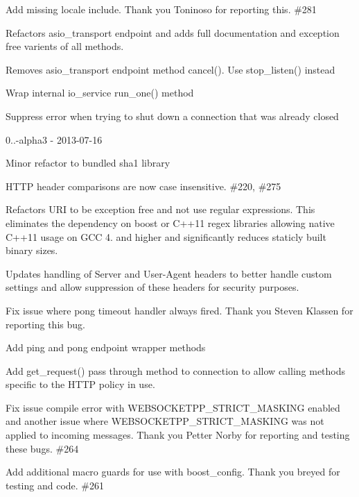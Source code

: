 \begin{DoxyItemize}
\item Add missing locale include. Thank you Toninoso for reporting this. \#281
\item Refactors {\ttfamily asio\+\_\+transport} endpoint and adds full documentation and exception free varients of all methods.
\item Removes {\ttfamily asio\+\_\+transport} endpoint method cancel(). Use {\ttfamily stop\+\_\+listen()} instead
\item Wrap internal {\ttfamily io\+\_\+service} {\ttfamily run\+\_\+one()} method
\item Suppress error when trying to shut down a connection that was already closed
\end{DoxyItemize}

0..-\/alpha3 -\/ 2013-\/07-\/16
\begin{DoxyItemize}
\item Minor refactor to bundled sha1 library
\item H\+T\+TP header comparisons are now case insensitive. \#220, \#275
\item Refactors U\+RI to be exception free and not use regular expressions. This eliminates the dependency on boost or C++11 regex libraries allowing native C++11 usage on G\+CC 4. and higher and significantly reduces staticly built binary sizes.
\item Updates handling of Server and User-\/\+Agent headers to better handle custom settings and allow suppression of these headers for security purposes.
\item Fix issue where pong timeout handler always fired. Thank you Steven Klassen for reporting this bug.
\item Add ping and pong endpoint wrapper methods
\item Add {\ttfamily get\+\_\+request()} pass through method to connection to allow calling methods specific to the H\+T\+TP policy in use.
\item Fix issue compile error with {\ttfamily W\+E\+B\+S\+O\+C\+K\+E\+T\+P\+P\+\_\+\+S\+T\+R\+I\+C\+T\+\_\+\+M\+A\+S\+K\+I\+NG} enabled and another issue where {\ttfamily W\+E\+B\+S\+O\+C\+K\+E\+T\+P\+P\+\_\+\+S\+T\+R\+I\+C\+T\+\_\+\+M\+A\+S\+K\+I\+NG} was not applied to incoming messages. Thank you Petter Norby for reporting and testing these bugs. \#264
\item Add additional macro guards for use with boost\+\_\+config. Thank you breyed for testing and code. \#261
\end{DoxyItemize}

